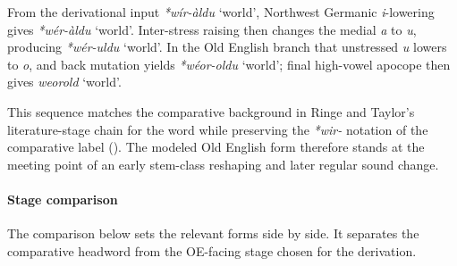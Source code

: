 \documentclass[
  british,
  a4paper,
]{article}
\providecommand{\Recon}[1]{\emph{*#1}}
\begin{document}
From the derivational input \Recon{wír-àldu} `world', Northwest Germanic
\emph{i}-lowering gives \Recon{wér-àldu} `world'. Inter-stress raising
then changes the medial \emph{a} to \emph{u}, producing \Recon{wér-uldu}
`world'. In the Old English branch that unstressed \emph{u} lowers to
\emph{o}, and back mutation yields \Recon{wéor-oldu} `world'; final
high-vowel apocope then gives \emph{weorold} `world'.

This sequence matches the comparative background in Ringe and Taylor's
literature-stage chain for the word while preserving the \emph{*wir-}
notation of the comparative label (). The modeled Old English form therefore stands at
the meeting point of an early stem-class reshaping and later regular
sound change.

\paragraph{Stage comparison}\label{stage-comparison-3}

The comparison below sets the relevant forms side by side. It separates
the comparative headword from the OE-facing stage chosen for the
derivation.
\end{document}
